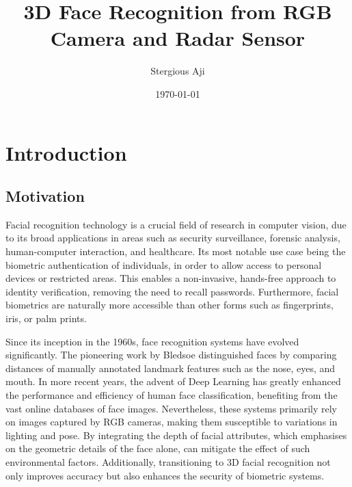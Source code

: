 \documentclass{interim}
\begin{document}
\title{3D Face Recognition from RGB Camera and Radar Sensor}
\author{Stergious Aji}
\date{\today}
\maketitle

{\hypersetup{hidelinks}\tableofcontents}
\newpage

\section{Introduction}\label{intro}

\subsection{Motivation}
Facial recognition technology is a crucial field of research in computer vision, due to its broad applications in areas such as security surveillance, forensic analysis, human-computer interaction, and healthcare. Its most notable use case being the biometric authentication of individuals, in order to allow access to personal devices or restricted areas. This enables a non-invasive, hands-free approach to identity verification, removing the need to recall passwords. Furthermore, facial biometrics are naturally more accessible than other forms such as fingerprints, iris, or palm prints.

Since its inception in the 1960s, face recognition systems have evolved significantly. The pioneering work by Bledsoe \cite{bledsoe1966model} distinguished faces by comparing distances of manually annotated landmark features such as the nose, eyes, and mouth. In more recent years, the advent of Deep Learning has greatly enhanced the performance and efficiency of human face classification, benefiting from the vast online databases of face images.  Nevertheless, these systems primarily rely on images captured by RGB cameras, making them susceptible to variations in lighting and pose. By integrating the depth of facial attributes, which emphasises on the geometric details of the face alone, can mitigate the effect of such environmental factors. Additionally, transitioning to 3D facial recognition not only improves accuracy but also enhances the security of biometric systems.
\end{document}
